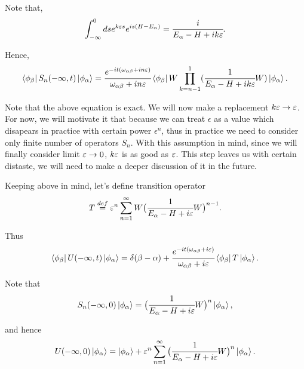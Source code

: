 \documentclass[main.tex]{subfiles}
\begin{document}
Note that,
\begin{equation}
 \int^0_{-\infty} ds e^{k\eepsilon s} e^{is(H - E_{\alpha})} = \cfrac{i}{E_\alpha - H + ik\eepsilon}.
\end{equation} 

Hence,
\begin{equation}
\bra{\phi_\beta}S_n (-\infty, t) \ket{\phi_\alpha} = \\
\cfrac{e^{-it(\omega_{\alpha\beta} +in\eepsilon)}}{\omega_{\alpha\beta}+in\eepsilon }
\bra{\phi_\beta} W \prod_{k = n - 1}^1 (\cfrac{1}{E_\alpha - H + ik\eepsilon}W) \ket{\phi_\alpha}.\\
\end{equation}

Note that the above equation is exact. We will now make a replacement $k\eepsilon \to \eepsilon$. For now, we will motivate it that because we can treat $\epsilon$ as a value which disapears in practice with certain power $\epsilon^n$, thus in practice we need to consider only finite number of operators $S_n$. With this assumption in mind, since we will finally consider limit $\eepsilon \to 0$, $k\eepsilon$ is as good as $\eepsilon$. This step leaves us with certain distaste, we will need to make a deeper discussion of it in the future.

Keeping above in mind, let's define transition operator
\begin{equation}
\label{transition-operator}
T  \stackrel{def}{=} \epsilon^n \sum_{n = 1}^\infty W \big(\cfrac{1}{E_\alpha - H + i\eepsilon}W\big)^{n - 1}.
\end{equation}

Thus
\begin{equation}
\bra{\phi_\beta}U (-\infty, t) \ket{\phi_\alpha} = \delta(\beta - \alpha) + \cfrac{e^{-it(\omega_{\alpha\beta} +i\eepsilon)}}{\omega_{\alpha\beta}+i\eepsilon } \bra{\phi_\beta}T \ket{\phi_\alpha}.
\end{equation}

Note that
\begin{equation}
S_n (-\infty, 0) \ket{\phi_\alpha} =  \big(\cfrac{1}{E_\alpha - H + i\eepsilon}W\big)^n \ket{\phi_\alpha},
\end{equation}

and hence
\begin{equation}
U(-\infty, 0) \ket{\phi_\alpha} = \ket{\phi_\alpha} + \epsilon^n \sum_{n=1}^\infty \big(\cfrac{1}{E_\alpha - H + i\eepsilon}W\big)^n \ket{\phi_\alpha}.
\end{equation}
\end{document}
